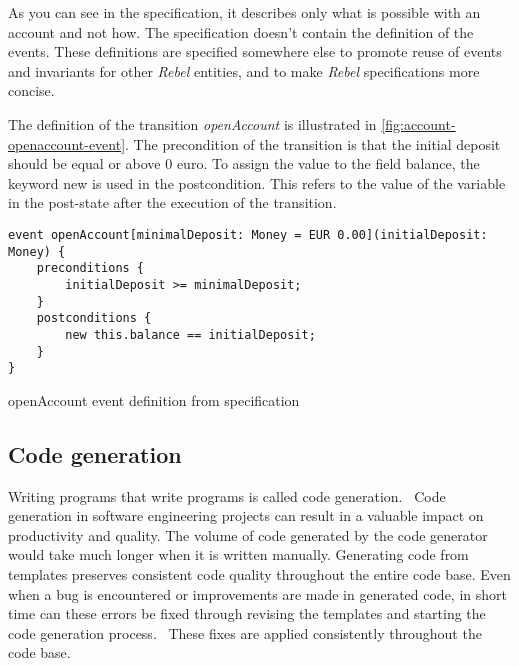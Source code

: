 As you can see in the specification, it describes only what is possible with an account and not how. The specification doesn't contain the definition of the events. These definitions are specified somewhere else to promote reuse of events and invariants for other \textit{Rebel} entities, and to make \textit{Rebel} specifications more concise.~\cite[p.~4]{stoel_storm_vinju_bosman_2016}

The definition of the transition \textit{openAccount} is illustrated in \autoref{fig:account-openaccount-event}. The precondition of the transition is that the initial deposit should be equal or above 0 euro. To assign the value to the field balance, the keyword new is used in the postcondition. This refers to the value of the variable in the post-state after the execution of the transition.~\cite[p.~4]{stoel_storm_vinju_bosman_2016}

\begin{sourcecode}[h!]
\begin{lstlisting}[]
event openAccount[minimalDeposit: Money = EUR 0.00](initialDeposit: Money) {
	preconditions {
		initialDeposit >= minimalDeposit;
	}
	postconditions {
		new this.balance == initialDeposit;
	}
}
\end{lstlisting}
\caption{openAccount event definition from specification}\label{fig:account-openaccount-event}
\end{sourcecode}
\FloatBarrier

\subsection{Code generation}\label{sec:ch2-codegen}

Writing programs that write programs is called code generation.~\cite[p.~3]{herrington2003code} Code generation in software engineering projects can result in a valuable impact on productivity and quality. The volume of code generated by the code generator would take much longer when it is written manually. Generating code from templates preserves consistent code quality throughout the entire code base. Even when a bug is encountered or improvements are made in generated code, in short time can these errors be fixed through revising the templates and starting the code generation process.~\cite[p.~15-17]{herrington2003code} These fixes are applied consistently throughout the code base. 

